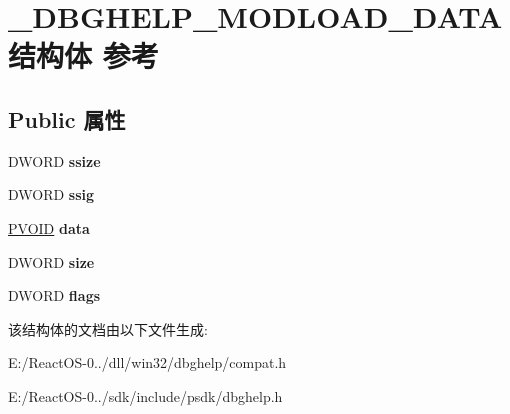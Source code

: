 \hypertarget{struct___d_b_g_h_e_l_p___m_o_d_l_o_a_d___d_a_t_a}{}\section{\+\_\+\+D\+B\+G\+H\+E\+L\+P\+\_\+\+M\+O\+D\+L\+O\+A\+D\+\_\+\+D\+A\+T\+A结构体 参考}
\label{struct___d_b_g_h_e_l_p___m_o_d_l_o_a_d___d_a_t_a}
\subsection*{Public 属性}
\begin{DoxyCompactItemize}
\item 
\mbox{\label{struct___d_b_g_h_e_l_p___m_o_d_l_o_a_d___d_a_t_a_a89e335f19602e4d4f934bc110ab8d4b1}} 
D\+W\+O\+RD {\bfseries ssize}
\item 
\mbox{\label{struct___d_b_g_h_e_l_p___m_o_d_l_o_a_d___d_a_t_a_a0590afc0e383145edeeb1dbc14fa133c}} 
D\+W\+O\+RD {\bfseries ssig}
\item 
\mbox{\label{struct___d_b_g_h_e_l_p___m_o_d_l_o_a_d___d_a_t_a_a8bf07bc5cdf964a846e61ea404d88646}} 
\hyperlink{interfacevoid}{P\+V\+O\+ID} {\bfseries data}
\item 
\mbox{\label{struct___d_b_g_h_e_l_p___m_o_d_l_o_a_d___d_a_t_a_a2cf39fb76b1fc503a3ddafc1af0ebced}} 
D\+W\+O\+RD {\bfseries size}
\item 
\mbox{\label{struct___d_b_g_h_e_l_p___m_o_d_l_o_a_d___d_a_t_a_a5ac666702bb041e31f7547b1fbe3f914}} 
D\+W\+O\+RD {\bfseries flags}
\end{DoxyCompactItemize}


该结构体的文档由以下文件生成\+:\begin{DoxyCompactItemize}
\item 
E\+:/\+React\+O\+S-\/0../dll/win32/dbghelp/compat.\+h\item 
E\+:/\+React\+O\+S-\/0../sdk/include/psdk/dbghelp.\+h\end{DoxyCompactItemize}
